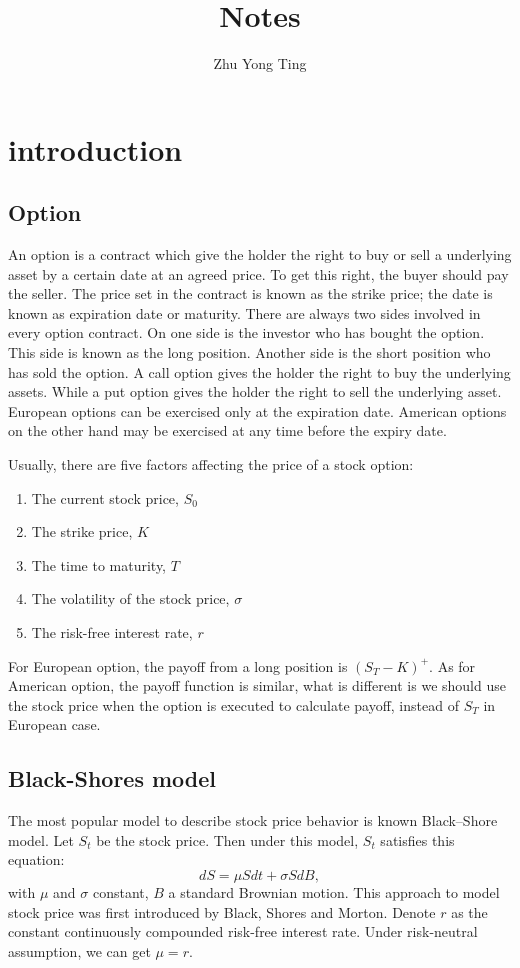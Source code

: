 \documentclass[11pt]{book}
\title{Notes}
\author{Zhu Yong Ting}
\begin{document}
\maketitle
\section{introduction}
\subsection{Option}

An option is a contract which give the holder the right to buy or sell a underlying asset by a certain date at an agreed price. To get this right, the buyer should pay the seller. The price set in the contract is known as the strike price; the date is known as expiration date or maturity. There are always two sides involved in every option contract. On one side  is the investor who has bought the option. This side is known as the long position. Another side is the short position who has sold the option. A call option gives the holder the right to buy the underlying assets. While a put option gives the holder the right to sell the underlying asset. European options can be exercised only at the expiration date. American options on the other hand may be exercised at any time before the expiry date. 

Usually, there are five factors affecting the price of a stock option:
\begin{enumerate}[1.]
\item The current stock price, $S_0$
\item The strike price, $K$
\item The time to maturity, $T$
\item The volatility of the stock price, $\sigma$
\item The risk-free interest rate, $r$
\end{enumerate}

For European option, the payoff from a long position is $(S_T - K)^+$. As for American option, the payoff function is
similar, what is different is we should use the stock price when the option is executed to calculate payoff, instead of $S_T$ in European case. 

\subsection{Black-Shores model}   
The most popular model to describe stock price behavior is known Black--Shore model. Let $S_t$ be the stock price. Then under this model, $S_t$ satisfies this equation: 
\begin{equation}\label{eq:1}
dS = \mu Sdt + \sigma SdB, 
\end{equation}
with $\mu$ and $\sigma $ constant, $B$ a standard Brownian motion. This approach to model stock price was first introduced by Black, Shores and Morton. Denote $r$ as the constant continuously compounded risk-free interest rate. Under risk-neutral assumption, we can get $\mu = r $. 
\end{document}
